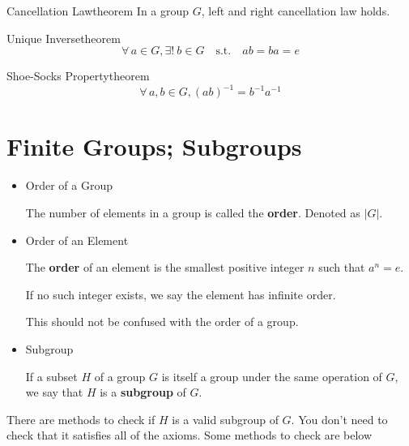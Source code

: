 \documentclass{report}
\let\oldforall\forall
\renewcommand{\forall}{\oldforall \, }
\let\oldexist\exists
\renewcommand{\exists}{\oldexist \: }
\newcommand\existu{\oldexist! \: }
\newcommand{\st}{\quad \mathrm{s.t.} \quad}
\newcommand{\inv}{^{-1}}
\begin{document}
\begin{theo}[colback=red!5!white,colframe=red!50!black]{Cancellation Law}{theorem}
In a group $G$, left and right cancellation law holds.
\end{theo}

\begin{theo}[colback=red!5!white,colframe=red!50!black]{Unique Inverse}{theorem}
\[ \forall a \in G, \existu b \in G \st ab = ba = e\]
\end{theo}

\begin{theo}[colback=red!5!white,colframe=red!50!black]{Shoe-Socks Property}{theorem}
  \[ \forall a, b \in G, (ab)\inv = b\inv a\inv \]
\end{theo}

\section{Finite Groups; Subgroups}
\begin{tcolorbox}[title=Definition]
  \begin{itemize}
    \item Order of a Group
    
    The number of elements in a group is called the \textbf{order}. Denoted as $|G|$.

    \item Order of an Element
    
    The \textbf{order} of an element is the smallest positive integer $n$ such that $a^n = e$.

    If no such integer exists, we say the element has infinite order.

    {\color{red} This should not be confused with the order of a group.}
    
    \item Subgroup
    
    If a subset $H$ of a group $G$ is itself a group under the same operation of $G$,
    we say that $H$ is a \textbf{subgroup} of $G$.
  \end{itemize}
\end{tcolorbox}
There are methods to check if $H$ is a valid subgroup of $G$. You don't need to check that it
satisfies all of the axioms. Some methods to check are below
\end{document}
